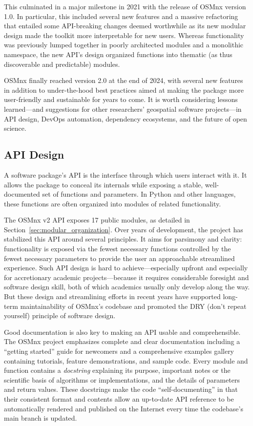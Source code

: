 \documentclass[12pt,letterpaper]{article} %
\begin{document}
This culminated in a major milestone in 2021 with the release of OSMnx version 1.0. In particular, this included several new features and a massive refactoring that entailed some API-breaking changes deemed worthwhile as its new modular design made the toolkit more interpretable for new users. Whereas functionality was previously lumped together in poorly architected modules and a monolithic namespace, the new API's design organized functions into thematic (as thus discoverable and predictable) modules.

OSMnx finally reached version 2.0 at the end of 2024, with several new features in addition to under-the-hood best practices aimed at making the package more user-friendly and sustainable for years to come. It is worth considering lessons learned---and suggestions for other researchers' geospatial software projects---in API design, DevOps automation, dependency ecosystems, and the future of open science.

\subsection{API Design}

A software package's API is the interface through which users interact with it. It allows the package to conceal its internals while exposing a stable, well-documented set of functions and parameters. In Python and other languages, these functions are often organized into modules of related functionality.

The OSMnx v2 API exposes 17 public modules, as detailed in Section~\ref{sec:modular_organization}. Over years of development, the project has stabilized this API around several principles. It aims for parsimony and clarity: functionality is exposed via the fewest necessary functions controlled by the fewest necessary parameters to provide the user an approachable streamlined experience. Such API design is hard to achieve---especially upfront and especially for accretionary academic projects---because it requires considerable foresight and software design skill, both of which academics usually only develop along the way. But these design and streamlining efforts in recent years have supported long-term maintainability of OSMnx's codebase and promoted the DRY (don't repeat yourself) principle of software design.

Good documentation is also key to making an API usable and comprehensible. The OSMnx project emphasizes complete and clear documentation including a \enquote{getting started} guide for newcomers and a comprehensive examples gallery containing tutorials, feature demonstrations, and sample code. Every module and function contains a \textit{docstring} explaining its purpose, important notes or the scientific basis of algorithms or implementations, and the details of parameters and return values. These docstrings make the code \enquote{self-documenting} in that their consistent format and contents allow an up-to-date API reference to be automatically rendered and published on the Internet every time the codebase's main branch is updated.
\end{document}
